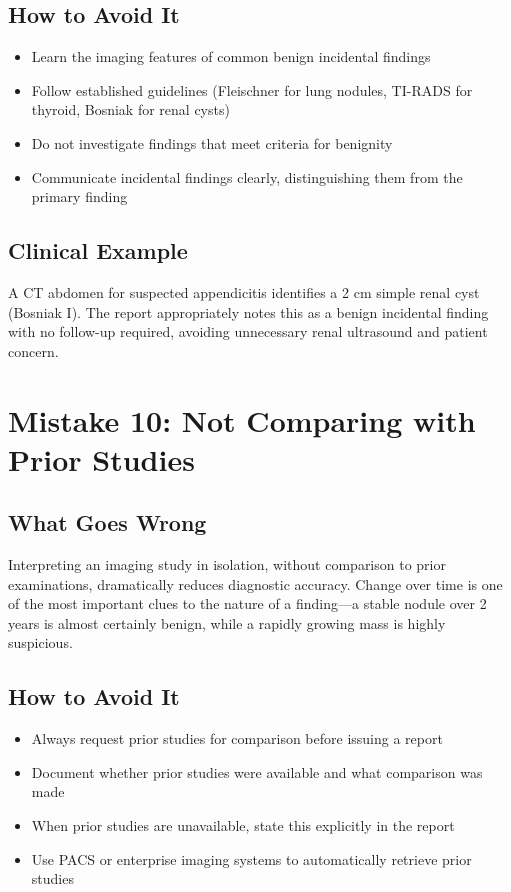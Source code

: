 \subsection{How to Avoid It}
\begin{itemize}
    \item Learn the imaging features of common benign incidental findings
    \item Follow established guidelines (Fleischner for lung nodules, TI-RADS for thyroid, Bosniak for renal cysts)
    \item Do not investigate findings that meet criteria for benignity
    \item Communicate incidental findings clearly, distinguishing them from the primary finding
\end{itemize}

\subsection{Clinical Example}
A CT abdomen for suspected appendicitis identifies a 2 cm simple renal cyst (Bosniak I). The report appropriately notes this as a benign incidental finding with no follow-up required, avoiding unnecessary renal ultrasound and patient concern.

\clearpage

\section{Mistake 10: Not Comparing with Prior Studies}

\subsection{What Goes Wrong}
Interpreting an imaging study in isolation, without comparison to prior examinations, dramatically reduces diagnostic accuracy. Change over time is one of the most important clues to the nature of a finding---a stable nodule over 2 years is almost certainly benign, while a rapidly growing mass is highly suspicious.

\subsection{How to Avoid It}
\begin{itemize}
    \item Always request prior studies for comparison before issuing a report
    \item Document whether prior studies were available and what comparison was made
    \item When prior studies are unavailable, state this explicitly in the report
    \item Use PACS or enterprise imaging systems to automatically retrieve prior studies
\end{itemize}

